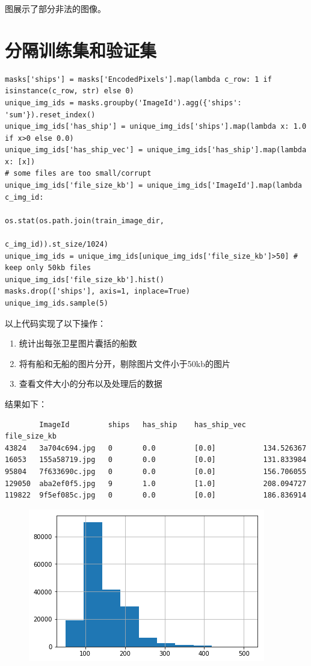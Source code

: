 图展示了部分非法的图像。

\section{分隔训练集和验证集}

\begin{verbatim}
masks['ships'] = masks['EncodedPixels'].map(lambda c_row: 1 if isinstance(c_row, str) else 0)
unique_img_ids = masks.groupby('ImageId').agg({'ships': 'sum'}).reset_index()
unique_img_ids['has_ship'] = unique_img_ids['ships'].map(lambda x: 1.0 if x>0 else 0.0)
unique_img_ids['has_ship_vec'] = unique_img_ids['has_ship'].map(lambda x: [x])
# some files are too small/corrupt
unique_img_ids['file_size_kb'] = unique_img_ids['ImageId'].map(lambda c_img_id: 
                                                            os.stat(os.path.join(train_image_dir, 
                                                                                    c_img_id)).st_size/1024)
unique_img_ids = unique_img_ids[unique_img_ids['file_size_kb']>50] # keep only 50kb files
unique_img_ids['file_size_kb'].hist()
masks.drop(['ships'], axis=1, inplace=True)
unique_img_ids.sample(5)
\end{verbatim}

以上代码实现了以下操作：

\begin{enumerate}
\def\labelenumi{\arabic{enumi}.}
\tightlist
\item
  统计出每张卫星图片囊括的船数
\item
  将有船和无船的图片分开，剔除图片文件小于50kb的图片
\item
  查看文件大小的分布以及处理后的数据
\end{enumerate}

结果如下：

\begin{verbatim}
        ImageId         ships   has_ship    has_ship_vec    file_size_kb
43824   3a704c694.jpg   0       0.0         [0.0]           134.526367
16053   155a58719.jpg   0       0.0         [0.0]           131.833984
95804   7f633690c.jpg   0       0.0         [0.0]           156.706055
129050  aba2ef0f5.jpg   9       1.0         [1.0]           208.094727
119822  9f5ef085c.jpg   0       0.0         [0.0]           186.836914
\end{verbatim}

\begin{figure}
\centering
\includegraphics{preprocessing_pic/3.png}
\caption{}
\end{figure}

